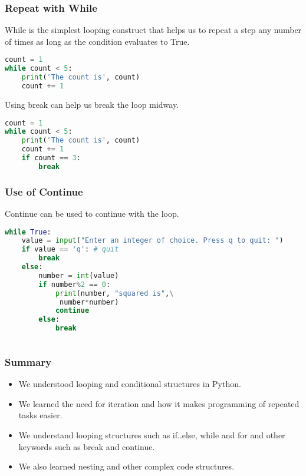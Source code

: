 \documentclass{beamer}
\begin{document}
\begin{frame}[fragile]
\frametitle{Repeat with While}
While is the simplest looping construct that helps us to repeat a step any number of times as long as the condition evaluates to True.
\begin{lstlisting}[language=Python]
count = 1
while count < 5:
    print('The count is', count)
    count += 1
\end{lstlisting}
Using break can help us break the loop midway.
\begin{lstlisting}[language=Python]
count = 1
while count < 5:
    print('The count is', count)
    count += 1
    if count == 3:
    	break
\end{lstlisting}
\end{frame}

\begin{frame}[fragile]
\frametitle{Use of Continue}
Continue can be used to continue with the loop.
\begin{lstlisting}[language=Python]
while True:
    value = input("Enter an integer of choice. Press q to quit: ")
    if value == 'q': # quit
        break
    else:
        number = int(value)
        if number%2 == 0:
            print(number, "squared is",\
             number*number)
            continue
        else:
            break
        
\end{lstlisting}
\end{frame}

\begin{frame}
\frametitle{Summary}
\begin{itemize}
\item We understood looping and conditional structures in Python.
\item We learned the need for iteration and how it makes programming of repeated tasks easier.
\item We understand looping structures such as if..else, while and for and other keywords such as break and continue.
\item We also learned nesting and other complex code structures.
\end{itemize}
\end{frame}
\end{document}
